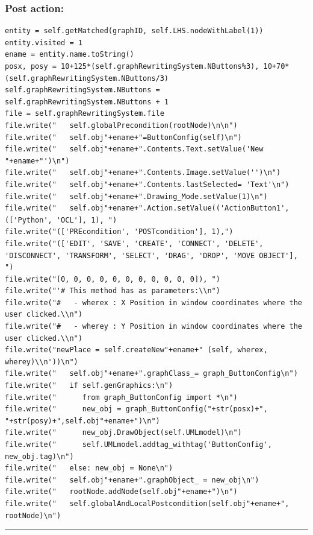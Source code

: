 \documentclass{article}
\begin{document}
\subsubsection*{Post action: }
\begin{small}\begin{verbatim}
entity = self.getMatched(graphID, self.LHS.nodeWithLabel(1))
entity.visited = 1
ename = entity.name.toString()
posx, posy = 10+125*(self.graphRewritingSystem.NButtons%3), 10+70*(self.graphRewritingSystem.NButtons/3)
self.graphRewritingSystem.NButtons = self.graphRewritingSystem.NButtons + 1
file = self.graphRewritingSystem.file
file.write("   self.globalPrecondition(rootNode)\n\n")
file.write("   self.obj"+ename+"=ButtonConfig(self)\n")
file.write("   self.obj"+ename+".Contents.Text.setValue('New "+ename+"')\n")
file.write("   self.obj"+ename+".Contents.Image.setValue('')\n")
file.write("   self.obj"+ename+".Contents.lastSelected= 'Text'\n")
file.write("   self.obj"+ename+".Drawing_Mode.setValue(1)\n")
file.write("   self.obj"+ename+".Action.setValue(('ActionButton1', (['Python', 'OCL'], 1), ")
file.write("(['PREcondition', 'POSTcondition'], 1),")
file.write("(['EDIT', 'SAVE', 'CREATE', 'CONNECT', 'DELETE', 'DISCONNECT', 'TRANSFORM', 'SELECT', 'DRAG', 'DROP', 'MOVE OBJECT'], ")
file.write("[0, 0, 0, 0, 0, 0, 0, 0, 0, 0, 0]), ")
file.write("'# This method has as parameters:\\n")
file.write("#   - wherex : X Position in window coordinates where the user clicked.\\n")
file.write("#   - wherey : Y Position in window coordinates where the user clicked.\\n")
file.write("newPlace = self.createNew"+ename+" (self, wherex, wherey)\\n'))\n")
file.write("   self.obj"+ename+".graphClass_= graph_ButtonConfig\n")
file.write("   if self.genGraphics:\n")
file.write("      from graph_ButtonConfig import *\n")
file.write("      new_obj = graph_ButtonConfig("+str(posx)+", "+str(posy)+",self.obj"+ename+")\n")
file.write("      new_obj.DrawObject(self.UMLmodel)\n")
file.write("      self.UMLmodel.addtag_withtag('ButtonConfig', new_obj.tag)\n")
file.write("   else: new_obj = None\n")
file.write("   self.obj"+ename+".graphObject_ = new_obj\n")
file.write("   rootNode.addNode(self.obj"+ename+")\n")
file.write("   self.globalAndLocalPostcondition(self.obj"+ename+", rootNode)\n")
\end{verbatim}\end{small}

\hrule \vspace{6pt}
\end{document}
